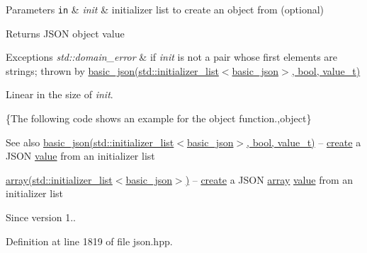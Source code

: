 \begin{DoxyParams}[1]{Parameters}
\mbox{\tt in}  & {\em init} & initializer list to create an object from (optional)\\
\hline
\end{DoxyParams}
\begin{DoxyReturn}{Returns}
J\+S\+O\+N object value
\end{DoxyReturn}

\begin{DoxyExceptions}{Exceptions}
{\em std\+::domain\+\_\+error} & if {\itshape init} is not a pair whose first elements are strings; thrown by \hyperlink{classnlohmann_1_1basic__json_afeb998aec45296bc2050bd1c41ef41eb}{basic\+\_\+json(std\+::initializer\+\_\+list$<$basic\+\_\+json$>$, bool, value\+\_\+t)}\\
\hline
\end{DoxyExceptions}
Linear in the size of {\itshape init}.

\{The following code shows an example for the {\ttfamily object} function.,object\}

\begin{DoxySeeAlso}{See also}
\hyperlink{classnlohmann_1_1basic__json_afeb998aec45296bc2050bd1c41ef41eb}{basic\+\_\+json(std\+::initializer\+\_\+list$<$basic\+\_\+json$>$, bool, value\+\_\+t)} -- \hyperlink{classnlohmann_1_1basic__json_a27df4303fbc83071275074486b54a40e}{create} a J\+S\+O\+N \hyperlink{classnlohmann_1_1basic__json_a0a2cbbd95862a623e7dc5c37e67dead0}{value} from an initializer list 

\hyperlink{classnlohmann_1_1basic__json_a5685815624b086caa532f41e853d4b0f}{array(std\+::initializer\+\_\+list$<$basic\+\_\+json$>$)} -- \hyperlink{classnlohmann_1_1basic__json_a27df4303fbc83071275074486b54a40e}{create} a J\+S\+O\+N \hyperlink{classnlohmann_1_1basic__json_a5685815624b086caa532f41e853d4b0f}{array} \hyperlink{classnlohmann_1_1basic__json_a0a2cbbd95862a623e7dc5c37e67dead0}{value} from an initializer list
\end{DoxySeeAlso}
\begin{DoxySince}{Since}
version 1.. 
\end{DoxySince}


Definition at line 1819 of file json.\+hpp.

\hypertarget{classnlohmann_1_1basic__json_a7c3182cfabc0bdd9f3a14216fe0e8154}{}

